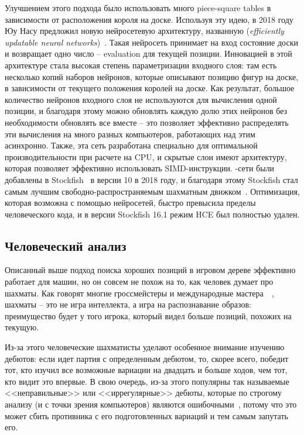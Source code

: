 \documentclass{article}
\begin{document}
Улучшением этого подхода было использовать много piece-square tables
в зависимости от расположения короля на доске. 
Используя эту идею, в 2018 году Юу Насу предложил новую нейросетевую архитектуру,
названную  (\emph{efficiently updatable neural networks})~\cite{nnue-paper}.
Такая нейросеть принимает на вход состояние доски и возвращает одно число -- evaluation
для текущей позиции.
Инновацией в этой архитектуре стала высокая степень параметризации входного слоя:
там есть несколько копий наборов нейронов, которые описывают позицию фигур на доске,
в зависимости от текущего положения королей на доске.
Как результат, большое количество нейронов входного слоя 
не используются для вычисления одной позиции,
и благодаря этому можно обновлять каждую долю этих нейронов без необходимости
обновлять все вместе --
это позволяет эффективно распределять эти вычисления на много разных компьютеров,
работающих над этим асинхронно.
Также, эта сеть разработана специально для оптимальной производительности
при расчете на CPU,
и скрытые слои имеют архитектуру, которая позволяет эффективно использовать SIMD-инструкции.
-сети были добавлены в Stockfish~\cite{stockfish} в версии 10 в 2018 году,
и благодаря этому Stockfish стал самым лучшим свободно-распространяемым шахматным движком~\cite{tcec-superfinal}.
Оптимизация, которая возможна с помощью нейросетей, быстро превысила пределы человеческого кода,
и в версии Stockfish 16.1 режим HCE был полностью удален.

\subsection{Человеческий анализ}

Описанный выше подход поиска хороших позиций в игровом дереве
эффективно работает для машин,
но он совсем не похож на то, как человек думает про шахматы.
Как говорят многие гроссмейстеры и международные мастера~\cite{benfinegold-blundering-short}~\cite{gothamchess-patterns},
шахматы -- это не игра интеллекта, а игра на распознавание образов:
преимущество будет у того игрока, который видел больше позиций, похожих на текущую. 

Из-за этого человеческие шахматисты уделают особенное внимание
изучению дебютов: если идет партия с определенным дебютом,
то, скорее всего, победит тот, кто изучил все возможные вариации на двадцать и больше ходов,
чем тот, кто видит это впервые.
В свою очередь, из-за этого популярны так называемые <<неправильные>> или <<иррегулярные>> дебюты,
которые по строгому анализу (и с точки зрения компьютеров) являются ошибочными~\cite{chessbase-chess-openings},
потому что это может сбить противника с его подготовленных вариаций и тем самым запутать его.
\end{document}
